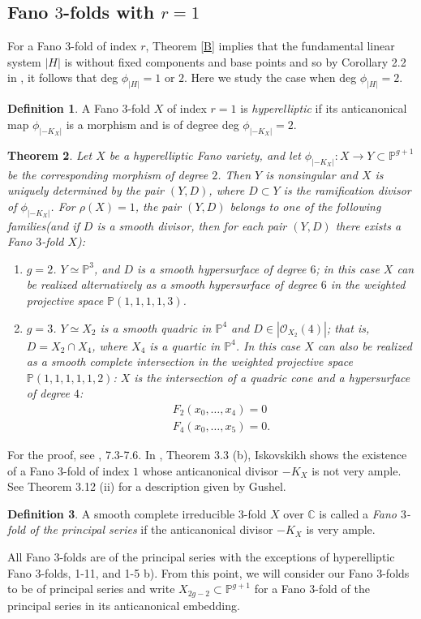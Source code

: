 \documentclass[11pt]{amsart}
\theoremstyle{plain}
\newtheorem{theorem}{Theorem}[section]
\theoremstyle{definition}
\newtheorem{definition}[theorem]{Definition}
\theoremstyle{expl}
\begin{document}
\subsection{Fano $3$-folds with $r=1$}
For a Fano $3$-fold of index $r$, Theorem \ref{B} implies that the fundamental linear system $|H|$ is without fixed components and base points and so by Corollary 2.2 in \cite{Isk77}, it follows that deg $\phi_{|H|} =1$ or $2$. Here we study the case when deg $\phi_{|H|}=2$. 
\begin{definition}
    A Fano $3$-fold $X$ of index $r=1$ is \textit{hyperelliptic} if its anticanonical map $\phi_{|-K_X|}$ is a morphism and is of degree deg $\phi_{|-K_X|} = 2$.
\end{definition}
\begin{theorem}
    Let $X$ be a hyperelliptic Fano variety, and let $\phi_{|-K_X|} : X \to Y \subset \mathbb{P}^{g+1}$ be the corresponding morphism of degree $2$. Then $Y$ is nonsingular and $X$ is uniquely determined by the pair $(Y,D)$, where $D\subset Y$ is the ramification divisor of $\phi_{|-K_X|}$. For $\rho(X)=1$, 
    the pair $(Y,D)$ belongs to one of the following families(and if $D$ is a smooth divisor, then for each pair $(Y,D)$ there exists a Fano $3$-fold $X$):
    \begin{enumerate}
        \item[(i)]$g=2$. $Y \simeq \mathbb{P}^3$, and $D$ is a smooth hypersurface of degree $6$; in this case $X$ can be realized alternatively as a smooth hypersurface of degree $6$ in the weighted projective space $\mathbb{P}(1,1,1,1,3)$. 
        \item[(ii)]$g=3$. $Y \simeq X_2$ is a smooth quadric in $\mathbb{P}^4$ and $D \in |\mathcal{O}_{X_2}(4)|$; that is, $D = X_2 \cap X_4$, where $X_4$ is a quartic in $\mathbb{P}^4$. In this case $X$ can also be realized as a smooth complete intersection in the weighted projective space $\mathbb{P}(1,1,1,1,1,2)$: $X$ is the intersection of a quadric cone and a hypersurface of degree $4$:
        \begin{gather*}
        F_2(x_0,  \dots , x_4)=0 \\
        F_4(x_0, \dots , x_5)=0.
        \end{gather*}
    \end{enumerate}
\end{theorem}
For the proof, see \cite{Isk77}, 7.3-7.6.
\medbreak
In \cite{Isk77}, Theorem 3.3 (b), Iskovskikh shows the existence of a Fano $3$-fold of index $1$ whose anticanonical divisor $-K_X$ is not very ample. See Theorem 3.12 (ii) for a description given by Gushel. 
\begin{definition}
    A smooth complete irreducible $3$-fold $X$ over $\mathbb{C}$ is called a \textit{Fano $3$-fold of the principal series} if the anticanonical divisor $-K_X$ is very ample.
\end{definition}
All Fano $3$-folds are of the principal series with the exceptions of hyperelliptic Fano $3$-folds, 1-11, and 1-5 b).  From this point, we will consider our Fano $3$-folds to be of principal series and write $X_{2g-2} \subset \mathbb{P}^{g+1}$ for a Fano $3$-fold of the principal series in its anticanonical embedding.
\end{document}
